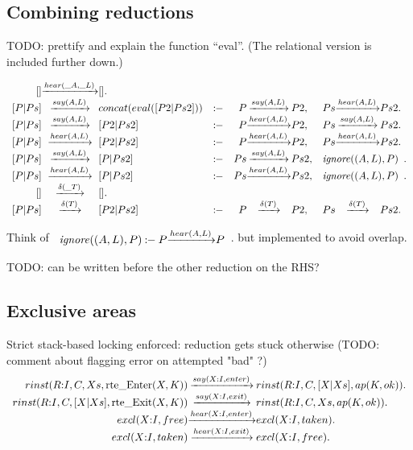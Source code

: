 \subsection{Combining reductions}

TODO: prettify and explain the function ``eval''. (The relational version is included further down.)

\[
\begin{array}{r@{}c@{}lcr@{}c@{}lr@{}c@{}l}
  \Preduce{[]}{hear(\_A,\_L)}{[]}. & &
\\\Preduce{[ P | Ps ]}{say(A,L)} {concat(eval([P2 | Ps2]))}  &\Pif& \Preduce{P}{say(A,L)}{P2}  ,&  \Preduce{Ps}{hear(A,L)}{Ps2}.
\\\Preduce{[ P | Ps ]}{say(A,L)} {[ P2 | Ps2 ]}  &\Pif& \Preduce{P} {hear(A,L)}{P2}   ,&  \Preduce{Ps}{say(A,L)} {Ps2} .
\\\Preduce{[ P | Ps ]}{hear(A,L)}{[ P2 | Ps2 ]}  &\Pif& \Preduce{P} {hear(A,L)}{P2}   ,&  \Preduce{Ps}{hear(A,L)}{Ps2} .
\\\Preduce{[ P | Ps ]}{say(A,L)} {[ P  | Ps2 ]}  &\Pif& \Preduce{Ps}{say(A,L)} {Ps2}  ,&  \multicolumn{3}{c}{\Pignore{((A,L),P)}}    .
\\\Preduce{[ P | Ps ]}{hear(A,L)}{[ P  | Ps2 ]}  &\Pif& \Preduce{Ps}{hear(A,L)}{Ps2}  ,&  \multicolumn{3}{c}{\Pignore{((A,L),P)}}    .
\\\Preduce{[]}{\delta(\_T)}{[]}. & &
\\\Preduce{[ P | Ps ]}{\delta(T)}{[ P2 | Ps2 ]}  &\Pif& \Preduce{P}{\delta(T)}{P2}    ,&  \Preduce{Ps}{\delta(T)}{Ps2}  .
\end{array}
\]

Think of
\(\begin{array}{r@{}c@{}l}\Pignore{((A,L),P)} \Pif
  \Preduce{P}{hear(A,L)}{P}\end{array}\).
but implemented to avoid overlap.

TODO: can  be written before the other reduction on the RHS?



\subsection{Exclusive areas}

Strict stack-based locking enforced: reduction gets stuck otherwise
(TODO: comment about flagging error on attempted "bad" ?)
\[
\begin{array}{r@{}c@{}l}
  \Preduce{rinst(R{:}I, C, Xs,     \rte{Enter}(X,K))}{say(X{:}I,enter)} {rinst(R{:}I, C, [X|Xs], ap(K,ok))}  .
\\\Preduce{rinst(R{:}I, C, [X|Xs], \rte{Exit}(X,K))} {say(X{:}I,exit)}  {rinst(R{:}I, C, Xs,     ap(K,ok))}      .
\\\Preduce{excl(X{:}I, free)}                     {hear(X{:}I,enter)}{excl(X{:}I, taken)}                 .
\\\Preduce{excl(X{:}I, taken)}                    {hear(X{:}I,exit)} {excl(X{:}I, free)}                  .
\end{array}
\]
